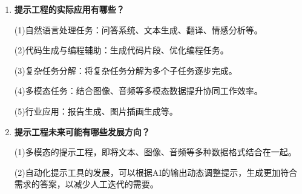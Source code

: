 \begin{enumerate}
(1)提示可能因为描述等方面出现歧义，难以生成预期的结果

(2)模型自身性能的限制

(3)难以处理多模态融合的提示

(4)伦理问题

\item \textbf{提示工程的实际应用有哪些？}

(1)自然语言处理任务：问答系统、文本生成、翻译、情感分析等。

(2)代码生成与编程辅助：生成代码片段、优化编程任务。

(3)复杂任务分解：将复杂任务分解为多个子任务逐步完成。

(4)多模态任务：结合图像、音频等多模态数据提升协同工作效率。

(5)行业应用：报告生成、图片插画生成等。

\item \textbf{提示工程未来可能有哪些发展方向？}

(1)多模态的提示工程，即将文本、图像、音频等多种数据格式结合在一起。

(2)自动化提示工具的发展，可以根据AI的输出动态调整提示，生成更加符合需求的答案，以减少人工迭代的需要。
\end{enumerate}